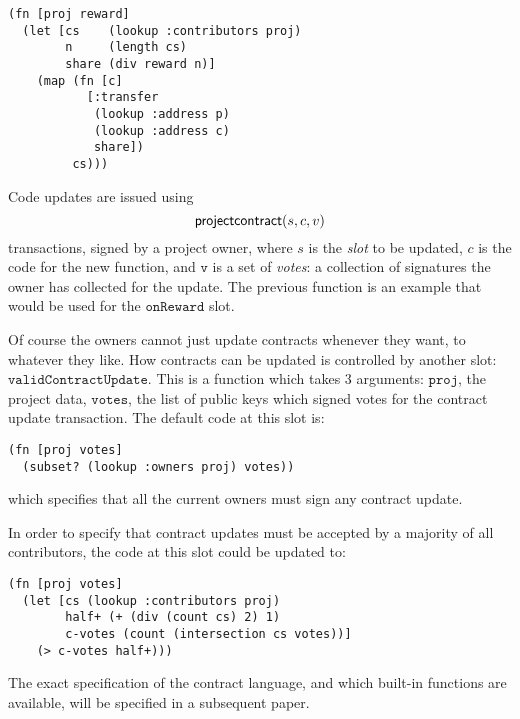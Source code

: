 \begin{lstlisting}
(fn [proj reward]
  (let [cs    (lookup :contributors proj)
        n     (length cs)
        share (div reward n)]
    (map (fn [c]
           [:transfer
            (lookup :address p)
            (lookup :address c)
            share])
         cs)))
\end{lstlisting}

Code updates are issued using
\[
    \mathsf{projectcontract}\small{\lparen s, c, v\rparen}
\]
transactions, signed by a project owner, where $s$ is the \emph{slot} to be
updated, $c$ is the code for the new function, and $\mathtt{v}$ is a set of
\emph{votes}: a collection of signatures the owner has collected for the
update. The previous function is an example that would be used for the
$\mathtt{onReward}$ slot.

Of course the owners cannot just update contracts whenever they want, to
whatever they like. How contracts can be updated is controlled by another slot:
$\mathtt{validContractUpdate}$. This is a function which takes 3 arguments:
$\mathtt{proj}$, the project data, $\mathtt{votes}$, the list of public keys
which signed votes for the contract update transaction. The default code at this
slot is:

\begin{lstlisting}
(fn [proj votes]
  (subset? (lookup :owners proj) votes))
\end{lstlisting}

which specifies that all the current owners must sign any contract update.

In order to specify that contract updates must be accepted by a majority of all
contributors, the code at this slot could be updated to:

\begin{lstlisting}
(fn [proj votes]
  (let [cs (lookup :contributors proj) 
        half+ (+ (div (count cs) 2) 1)
        c-votes (count (intersection cs votes))]
    (> c-votes half+)))
\end{lstlisting}

The exact specification of the contract language, and which built-in functions
are available, will be specified in a subsequent paper.
